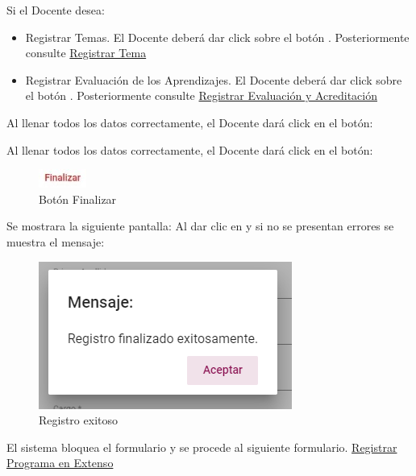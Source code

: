 Si el Docente desea:

\begin{itemize}
    \item Registrar Temas. El Docente deberá dar click sobre el botón . Posteriormente consulte \hyperlink{RegistrarTema}{Registrar Tema}
    \item Registrar Evaluación de los Aprendizajes. El Docente deberá dar click sobre el botón . Posteriormente consulte \hyperlink{REA}{Registrar Evaluación y Acreditación}
\end{itemize}

Al llenar todos los datos correctamente, el Docente dará click en el botón:

Al llenar todos los datos correctamente, el Docente dará click en el botón:

\begin{figure}[H]
    \centering
    \includegraphics[width=0.1\linewidth]{images/SP6/BotonFinalizar.jpeg}
    \caption{Botón Finalizar}
\end{figure}

Se mostrara la siguiente pantalla:
Al dar clic en  y si no se presentan errores se muestra el mensaje:


\begin{figure}[H]
    \centering
    \includegraphics[width=0.4\linewidth]{images/SP6/MSG5.png}
    \caption{Registro exitoso}
    \label{mensaje5}
\end{figure}


El sistema bloquea el formulario y se procede al siguiente formulario. \hyperlink{RPE}{Registrar Programa en Extenso}


